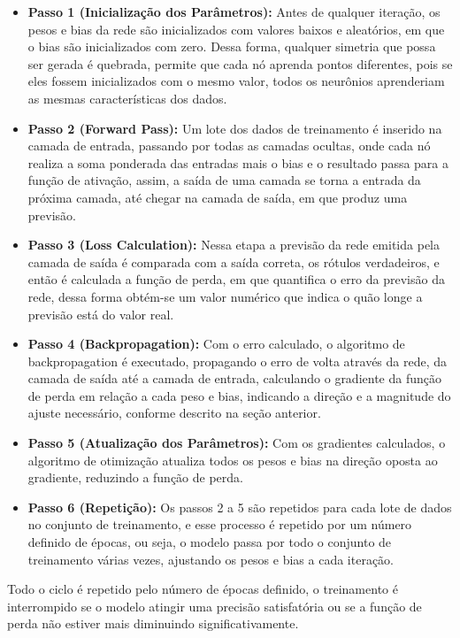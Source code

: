 \begin{itemize}
    \item \textbf{Passo 1 (Inicialização dos Parâmetros):} Antes de qualquer iteração, os pesos e bias da rede são inicializados com valores baixos e aleatórios, em que o bias são inicializados com zero. Dessa forma, qualquer simetria que possa ser gerada é quebrada, permite que cada nó aprenda pontos diferentes, pois se eles fossem inicializados com o mesmo valor, todos os neurônios aprenderiam as mesmas características dos dados.
    \item \textbf{Passo 2 (Forward Pass):} Um lote dos dados de treinamento é inserido na camada de entrada, passando por todas as camadas ocultas, onde cada nó realiza a soma ponderada das entradas mais o bias e o resultado passa para a função de ativação, assim, a saída de uma camada se torna a entrada da próxima camada, até chegar na camada de saída, em que produz uma previsão.
    \item \textbf{Passo 3 (Loss Calculation):} Nessa etapa a previsão da rede emitida pela camada de saída é comparada com a saída correta, os rótulos verdadeiros, e então é calculada a função de perda, em que quantifica o erro da previsão da rede, dessa forma obtém-se um valor numérico que indica o quão longe a previsão está do valor real.
    \item \textbf{Passo 4 (Backpropagation):} Com o erro calculado, o algoritmo de backpropagation é executado, propagando o erro de volta através da rede, da camada de saída até a camada de entrada, calculando o gradiente da função de perda em relação a cada peso e bias, indicando a direção e a magnitude do ajuste necessário, conforme descrito na seção anterior.
    \item \textbf{Passo 5 (Atualização dos Parâmetros):} Com os gradientes calculados, o algoritmo de otimização atualiza todos os pesos e bias na direção oposta ao gradiente, reduzindo a função de perda.
    \item \textbf{Passo 6 (Repetição):} Os passos 2 a 5 são repetidos para cada lote de dados no conjunto de treinamento, e esse processo é repetido por um número definido de épocas, ou seja, o modelo passa por todo o conjunto de treinamento várias vezes, ajustando os pesos e bias a cada iteração.
\end{itemize}
Todo o ciclo é repetido pelo número de épocas definido, o treinamento é interrompido se o modelo atingir uma precisão satisfatória ou se a função de perda não estiver mais diminuindo significativamente.

